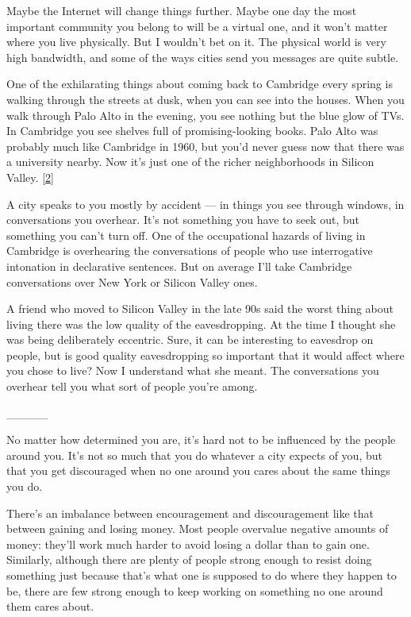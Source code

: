 Maybe the Internet will change things further. Maybe one day the most
important community you belong to will be a virtual one, and it won't
matter where you live physically. But I wouldn't bet on it. The physical
world is very high bandwidth, and some of the ways cities send you
messages are quite subtle.

One of the exhilarating things about coming back to Cambridge every
spring is walking through the streets at dusk, when you can see into the
houses. When you walk through Palo Alto in the evening, you see nothing
but the blue glow of TVs. In Cambridge you see shelves full of
promising-looking books. Palo Alto was probably much like Cambridge in
1960, but you'd never guess now that there was a university nearby. Now
it's just one of the richer neighborhoods in Silicon Valley.
{[}\hyperref[f2n]{2}{]}

A city speaks to you mostly by accident --- in things you see through
windows, in conversations you overhear. It's not something you have to
seek out, but something you can't turn off. One of the occupational
hazards of living in Cambridge is overhearing the conversations of
people who use interrogative intonation in declarative sentences. But on
average I'll take Cambridge conversations over New York or Silicon
Valley ones.

A friend who moved to Silicon Valley in the late 90s said the worst
thing about living there was the low quality of the eavesdropping. At
the time I thought she was being deliberately eccentric. Sure, it can be
interesting to eavesdrop on people, but is good quality eavesdropping so
important that it would affect where you chose to live? Now I understand
what she meant. The conversations you overhear tell you what sort of
people you're among.

\_\_\_\_\_

No matter how determined you are, it's hard not to be influenced by the
people around you. It's not so much that you do whatever a city expects
of you, but that you get discouraged when no one around you cares about
the same things you do.

There's an imbalance between encouragement and discouragement like that
between gaining and losing money. Most people overvalue negative amounts
of money: they'll work much harder to avoid losing a dollar than to gain
one. Similarly, although there are plenty of people strong enough to
resist doing something just because that's what one is supposed to do
where they happen to be, there are few strong enough to keep working on
something no one around them cares about.

